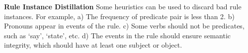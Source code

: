 
\textbf{Rule Instance Distillation} Some heuristics can be used to discard bad rule instances. 
For example, 
a) The frequency of predicate pair is less than 2. 
b) Pronouns appear in events of the rule. 
c) Some verbs should not be predicates, such as `say', `state', etc. 
d) The events in the rule should ensure semantic integrity, which should have at least one subject or object.

